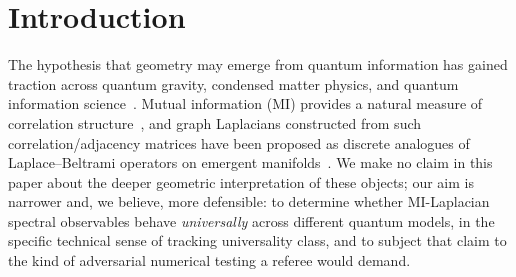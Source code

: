 \documentclass[aps,prx,reprint,amsmath,amssymb,superscriptaddress]{revtex4-2}
\begin{document}
\begin{abstract}
Independent of the MI-Laplacian claims, we validate the ground states themselves two ways: a
Calabrese-Cardy fit of the half-chain entanglement entropy recovers the exact central charges
($c=0.497$ vs.\ $1/2$ for TFIM, $c=0.986$ vs.\ $1$ for XXZ, both $R^2>0.9999$), and a standard
finite-size-scaling collapse of the TFIM physical energy gap under the known Ising exponent $\nu=1$
collapses cleanly across $N=8$--$20$. All numerical results, including a pytest correctness suite
(Hermiticity, the spin-glass and free-fermion consistency checks, synthetic-data recovery of known
fitting forms, and DMRG/ED cross-validation), are reproducible from the accompanying code release.
\end{abstract}

\maketitle

\section{Introduction}

The hypothesis that geometry may emerge from quantum information has gained traction across
quantum gravity, condensed matter physics, and quantum information
science~\cite{VanRaamsdonk2010,RyuTakayanagi2006,Swingle2012}. Mutual information (MI) provides a
natural measure of correlation structure~\cite{Valdez2017,LeightonTrudel2025}, and graph Laplacians
constructed from such correlation/adjacency matrices have been proposed as discrete analogues of
Laplace--Beltrami operators on emergent manifolds~\cite{BelkinNiyogi2003,vonLuxburg2007}. We
make no claim in this paper about the deeper geometric interpretation of these objects; our aim is
narrower and, we believe, more defensible: to determine whether MI-Laplacian spectral observables
behave \emph{universally} across different quantum models, in the specific technical sense of
tracking universality class, and to subject that claim to the kind of adversarial numerical testing
a referee would demand.
\end{document}
